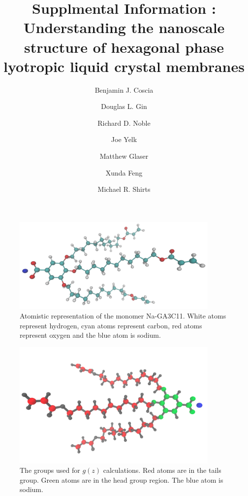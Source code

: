 \documentclass{article}
\title{Supplmental Information : Understanding the nanoscale structure of hexagonal phase lyotropic liquid crystal membranes}
\author{Benjamin J. Coscia \and Douglas L. Gin \and Richard D. Noble \and Joe Yelk \and Matthew Glaser \and Xunda Feng \and Michael R. Shirts}
\begin{document}
  \graphicspath{{./figures/}}  %
  \maketitle

  \begin{figure}
	\centering
        \includegraphics[width=0.9\textwidth]{monomer.png}
	\caption{Atomistic representation of the monomer Na-GA3C11. White atoms
		represent hydrogen, cyan atoms represent carbon, red atoms represent oxygen and
		the blue atom is sodium.}\label{fig:monomer}
  \end{figure}

  \begin{figure}
	\centering
        \includegraphics[width=0.9\textwidth]{monomer_color_coded.png}
	\caption{The groups used for $g(z)$ calculations. Red atoms are in the
		tails group. Green atoms are in the head group region. The blue atom is sodium. 
		}\label{fig:monomer_color_coded}
  \end{figure}
\end{document}
